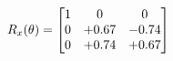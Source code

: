 \documentclass[preview]{standalone}
\begin{document}
\begin{align*}
\special{dvisvgm:raw <g id='unique000'>}R_{x}(\theta) = \begin{bmatrix}1 & 0 & 0 \\0 & +0.67 & -0.74 \\0 & +0.74 & +0.67\end{bmatrix}\special{dvisvgm:raw </g>}
\end{align*}
\end{document}
